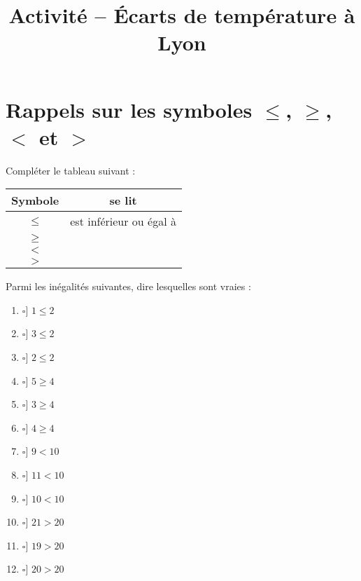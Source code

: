 \documentclass[a4paper,dvipsnames]{article}
\newcommand{\checkbox}{\makebox[0pt][l]{$\square$}\raisebox{.15ex}{\hspace{0.1em}}\hspace{3mm}}
\begin{document}
\title{Activité -- Écarts de température à Lyon}

\date{}
\author{}

\maketitle{}

\thispagestyle{empty}
\pagestyle{empty}

\section{Rappels sur les symboles $\leq$, $\geq$, $<$ et $>$}

Compléter le tableau suivant :

\begin{center}
  \begin{tabular}{@{}cc@{}}
    \toprule
    Symbole & se lit \\
    \midrule
    $\leq$ & est inférieur ou égal à \\
    $\geq$ & \\
    $<$ & \\
    $>$ & \\
    \bottomrule
  \end{tabular}
\end{center}

Parmi les inégalités suivantes, dire lesquelles sont vraies :

\begin{multicols}{4}
  \begin{enumerate}
    \item[\checkbox] $1\leq 2$
    \item[\checkbox] $3\leq 2$
    \item[\checkbox] $2\leq 2$
    \item[\checkbox] $5\geq 4$ 
    \item[\checkbox] $3\geq 4$
    \item[\checkbox] $4\geq 4$
    \item[\checkbox] $9<10$
    \item[\checkbox] $11<10$
    \item[\checkbox] $10<10$
    \item[\checkbox] $21>20$
    \item[\checkbox] $19>20$
    \item[\checkbox] $20>20$
  \end{enumerate}
\end{multicols}
\end{document}
